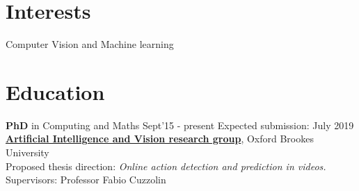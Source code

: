 \documentclass[line, margin]{res}
\begin{document}
\address{\textbf{Web:} \url{http://gurkirt.github.io/}\\\textbf{Email:} \href{mailto:gurkirt.singh-2015@brookes.ac.uk}{\nolinkurl{gurkirt.singh-2015@brookes.ac.uk}}\\\textbf{Tel:}+1 2368084391} 

\begin{resume}


\section{Interests}
Computer Vision and Machine learning


\section{Education} 
\textbf{PhD} in Computing and Maths  \hfill Sept'15 - present \quad  Expected submission: July 2019\\
\href{http://cct.brookes.ac.uk/research/isec/artificial-intelligence/index.html}{\textbf{Artificial Intelligence and Vision research group}}, Oxford Brookes University\\
Proposed thesis direction: \emph{Online action detection and prediction in videos.} \\
Supervisors: 
{Professor Fabio Cuzzolin}


\end{resume}
\end{document}
